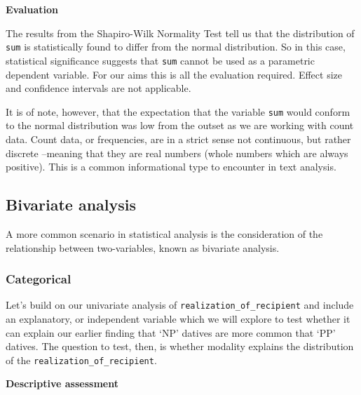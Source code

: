 \documentclass[
]{article}
\newenvironment{Shaded}{\begin{snugshade}}{\end{snugshade}}
\newcommand{\CommentTok}[1]{\textcolor[rgb]{0.56,0.35,0.01}{\textit{#1}}}
\newcommand{\FloatTok}[1]{\textcolor[rgb]{0.00,0.00,0.81}{#1}}
\newcommand{\NormalTok}[1]{#1}
\newcommand{\SpecialCharTok}[1]{\textcolor[rgb]{0.00,0.00,0.00}{#1}}
\begin{document}
\begin{Shaded}
\end{Shaded}

\textbf{Evaluation}

The results from the Shapiro-Wilk Normality Test tell us that the distribution of \texttt{sum} is statistically found to differ from the normal distribution. So in this case, statistical significance suggests that \texttt{sum} cannot be used as a parametric dependent variable. For our aims this is all the evaluation required. Effect size and confidence intervals are not applicable.

It is of note, however, that the expectation that the variable \texttt{sum} would conform to the normal distribution was low from the outset as we are working with count data. Count data, or frequencies, are in a strict sense not continuous, but rather discrete --meaning that they are real numbers (whole numbers which are always positive). This is a common informational type to encounter in text analysis.

\hypertarget{bivariate-analysis}{%
\subsection{Bivariate analysis}\label{bivariate-analysis}}

A more common scenario in statistical analysis is the consideration of the relationship between two-variables, known as bivariate analysis.

\hypertarget{categorical-1}{%
\subsubsection{Categorical}\label{categorical-1}}

Let's build on our univariate analysis of \texttt{realization\_of\_recipient} and include an explanatory, or independent variable which we will explore to test whether it can explain our earlier finding that `NP' datives are more common that `PP' datives. The question to test, then, is whether modality explains the distribution of the \texttt{realization\_of\_recipient}.

\textbf{Descriptive assessment}
\end{document}
